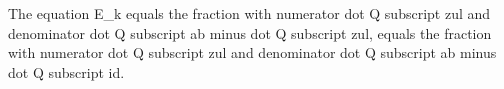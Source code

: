 The equation E_k equals the fraction with numerator dot Q subscript zul and denominator dot Q subscript ab minus dot Q subscript zul, equals the fraction with numerator dot Q subscript zul and denominator dot Q subscript ab minus dot Q subscript id.